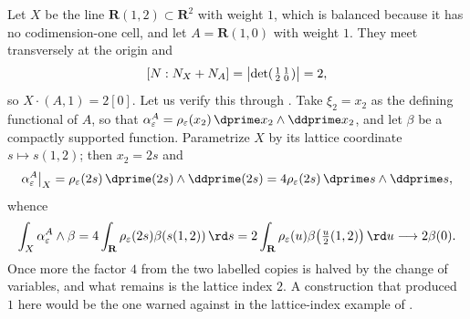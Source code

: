 \begin{example}
\label{ex:ch11-index-test-current}
Let $X$ be the line $\mathbf R(1,2)\subset\mathbf R^2$ with weight $1$,
which is balanced because it has no codimension-one cell, and let
$A=\mathbf R(1,0)$ with weight $1$.  They meet transversely at the origin
and
\[
 [N:N_X+N_A]
 =\bigl|\det\begin{psmallmatrix}1&1\\2&0\end{psmallmatrix}\bigr|=2 ,
\]
so $X\cdot(A,1)=2[0]$.  Let us verify this through
.  Take $\xi_2=x_2$ as the
defining functional of $A$, so that
$\alpha^A_\varepsilon=\rho_\varepsilon(x_2)\,\dprime x_2\wedge\ddprime x_2$,
and let $\beta$ be a compactly supported function.  Parametrize $X$ by its
lattice coordinate $s\mapsto s(1,2)$; then $x_2=2s$ and
\[
 \alpha^A_\varepsilon\big|_X=\rho_\varepsilon(2s)\,
   \dprime(2s)\wedge\ddprime(2s)
 =4\rho_\varepsilon(2s)\,\dprime s\wedge\ddprime s,
\]
whence
\[
 \int_X\alpha^A_\varepsilon\wedge\beta
 =4\int_{\mathbf R}\rho_\varepsilon(2s)\beta(s(1,2))\,\rd s
 =2\int_{\mathbf R}\rho_\varepsilon(u)\beta\bigl(\tfrac u2(1,2)\bigr)\,\rd u
 \longrightarrow 2\beta(0).
\]
Once more the factor $4$ from the two labelled copies is halved by the
change of variables, and what remains is the lattice index $2$.  A
construction that produced $1$ here would be the one warned against in the
lattice-index example of .
\end{example}

